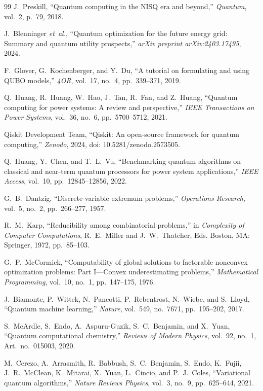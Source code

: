 \documentclass[11pt,a4paper]{article}
\theoremstyle{definition}
\theoremstyle{remark}
\begin{document}
\begin{thebibliography}{99}
J.~Preskill, ``Quantum computing in the NISQ era and beyond,'' \textit{Quantum}, vol.~2, p.~79, 2018.

J.~Blenninger \textit{et~al.}, ``Quantum optimization for the future energy grid: Summary and quantum utility prospects,'' \textit{arXiv preprint arXiv:2403.17495}, 2024.

F.~Glover, G.~Kochenberger, and Y.~Du, ``A tutorial on formulating and using QUBO models,'' \textit{4OR}, vol.~17, no.~4, pp.~339--371, 2019.

Q.~Huang, R.~Huang, W.~Hao, J.~Tan, R.~Fan, and Z.~Huang, ``Quantum computing for power systems: A review and perspective,'' \textit{IEEE Transactions on Power Systems}, vol.~36, no.~6, pp.~5700--5712, 2021.

Qiskit Development Team, ``Qiskit: An open-source framework for quantum computing,'' \textit{Zenodo}, 2024, doi: 10.5281/zenodo.2573505.

Q.~Huang, Y.~Chen, and T.~L.~Vu, ``Benchmarking quantum algorithms on classical and near-term quantum processors for power system applications,'' \textit{IEEE Access}, vol.~10, pp.~12845--12856, 2022.

G.~B.~Dantzig, ``Discrete-variable extremum problems,'' \textit{Operations Research}, vol.~5, no.~2, pp.~266--277, 1957.

R.~M.~Karp, ``Reducibility among combinatorial problems,'' in \textit{Complexity of Computer Computations}, R.~E.~Miller and J.~W.~Thatcher, Eds. Boston, MA: Springer, 1972, pp.~85--103.

G.~P.~McCormick, ``Computability of global solutions to factorable nonconvex optimization problems: Part I---Convex underestimating problems,'' \textit{Mathematical Programming}, vol.~10, no.~1, pp.~147--175, 1976.

J.~Biamonte, P.~Wittek, N.~Pancotti, P.~Rebentrost, N.~Wiebe, and S.~Lloyd, ``Quantum machine learning,'' \textit{Nature}, vol.~549, no.~7671, pp.~195--202, 2017.

S.~McArdle, S.~Endo, A.~Aspuru-Guzik, S.~C.~Benjamin, and X.~Yuan, ``Quantum computational chemistry,'' \textit{Reviews of Modern Physics}, vol.~92, no.~1, Art.~no.~015003, 2020.

M.~Cerezo, A.~Arrasmith, R.~Babbush, S.~C.~Benjamin, S.~Endo, K.~Fujii, J.~R.~McClean, K.~Mitarai, X.~Yuan, L.~Cincio, and P.~J.~Coles, ``Variational quantum algorithms,'' \textit{Nature Reviews Physics}, vol.~3, no.~9, pp.~625--644, 2021.


\end{thebibliography}
\end{document}
